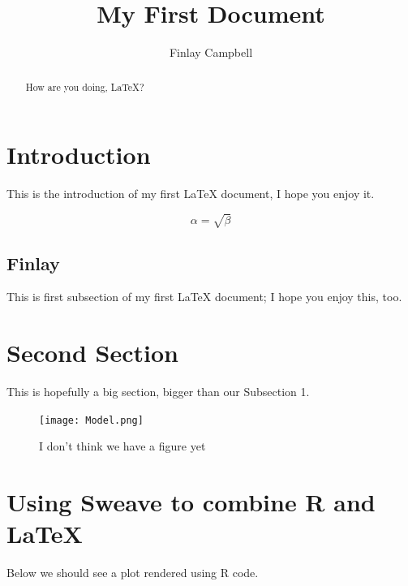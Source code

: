 \documentclass{article}
\begin{document}
\title{My First Document}
\author{Finlay Campbell}

\maketitle

\begin{abstract}
	How are you doing, LaTeX?
\end{abstract}

\section{Introduction}
	This is the introduction of my first LaTeX document, I hope you enjoy it.
	
\begin{equation}
	\label{This is an equation}	
	\alpha = \sqrt{ \beta }
\end{equation}
	
\subsection{Finlay}
	This is first subsection of my first LaTeX document; I hope you enjoy this, too.

\section{Second Section}
	This is hopefully a big section, bigger than our Subsection 1.

\begin{figure}[!ht]
	\centering
	\texttt{[image: Model.png]}
	\caption{I don't think we have a figure yet}
\end{figure}

\section{Using Sweave to combine R and LaTeX}
Below we should see a plot rendered using R code.
\end{document}
